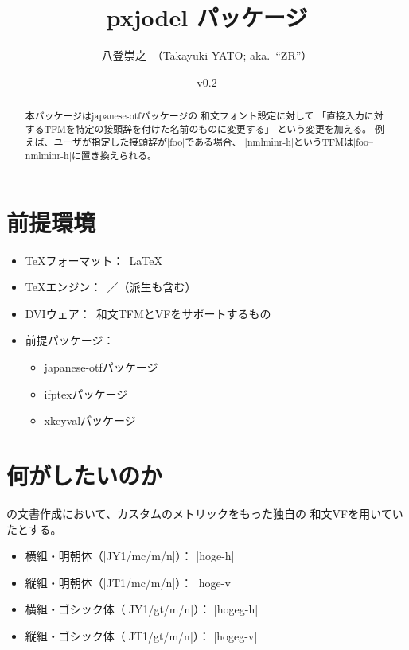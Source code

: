 \documentclass[uplatex,dvipdfmx,a4paper]{jsarticle}
\newcommand{\PkgVersion}{0.2}
\newcommand{\PkgDate}{2019/02/02}
\newcommand{\Pkg}[1]{\textsf{#1}}
\newcommand{\Means}{：\ }
\begin{document}
\title{\Pkg{pxjodel} パッケージ}
\author{八登崇之\ （Takayuki YATO; aka.~``ZR''）}
\date{v\PkgVersion\quad[\PkgDate]}
\maketitle

\begin{abstract}
本パッケージは\Pkg{japanese-otf}パッケージの
和文フォント設定に対して
「直接入力に対するTFMを特定の接頭辞を付けた名前のものに変更する」
という変更を加える。
例えば、ユーザが指定した接頭辞が|foo|である場合、
|nmlminr-h|というTFMは|foo--nmlminr-h|に置き換えられる。
\end{abstract}


\section{前提環境}
\label{sec:Requirement}

\begin{itemize}
\item {\TeX}フォーマット\Means {\LaTeX}
\item {\TeX}エンジン\Means {\pTeX}／{\upTeX}（派生も含む）
\item DVIウェア\Means 和文TFMとVFをサポートするもの
\item 前提パッケージ\Means
  \begin{itemize}
  \item \Pkg{japanese-otf}パッケージ
  \item \Pkg{ifptex}パッケージ
  \item \Pkg{xkeyval}パッケージ
  \end{itemize}
\end{itemize}

\section{何がしたいのか}
\label{sec:Objective}

{\pLaTeX}の文書作成において、カスタムのメトリックをもった独自の
和文VFを用いていたとする。

\begin{itemize}
\item 横組・明朝体（|JY1/mc/m/n|）： |hoge-h|
\item 縦組・明朝体（|JT1/mc/m/n|）： |hoge-v|
\item 横組・ゴシック体（|JY1/gt/m/n|）： |hogeg-h|
\item 縦組・ゴシック体（|JT1/gt/m/n|）： |hogeg-v|
\end{itemize}
\end{document}
